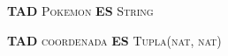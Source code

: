 \documentclass[10pt, a4paper]{article}
\begin{document}
\maketitle


\pagebreak




\newpage

\textbf{TAD} \textsc{Pokemon} \textbf{ES} \textsc{String}

\textbf{TAD} \textsc{coordenada} \textbf{ES} \textsc{Tupla(nat, nat)}

$ $\newline



%

\newpage




\newpage

\end{document}
